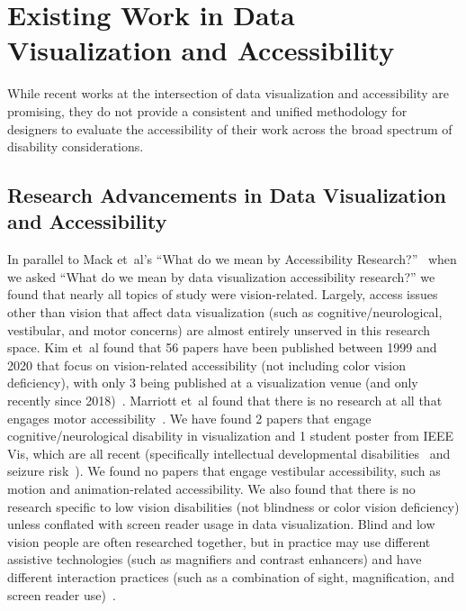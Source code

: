 \documentclass[12pt]{cmuthesis}
\newcommand{\ea}{{et~al\xperiod}\xspace}
\begin{document}
\section{Existing Work in Data Visualization and Accessibility}

While recent works at the intersection of data visualization and accessibility are promising, they do not provide a consistent and unified methodology for designers to evaluate the accessibility of their work across the broad spectrum of disability considerations.

\subsection{Research Advancements in Data Visualization and Accessibility}
In parallel to Mack \ea's ``What do we mean by Accessibility Research?''~\cite{Mack2021What} when we asked ``What do we mean by data visualization accessibility research?'' we found that nearly all topics of study were vision-related. Largely, access issues other than vision that affect data visualization (such as cognitive/neurological, vestibular, and motor concerns) are almost entirely unserved in this research space. Kim \ea found that 56 papers have been published between 1999 and 2020 that focus on vision-related accessibility (not including color vision deficiency), with only 3 being published at a visualization venue (and only recently since 2018)~\cite{Kim2021Accessible}. Marriott \ea found that there is no research at all that engages motor accessibility~\cite{Marriott}. We have found 2 papers that engage cognitive/neurological disability in visualization and 1 student poster from IEEE Vis, which are all recent (specifically intellectual developmental disabilities~\cite{Wu2021Understanding} and seizure risk~\cite{South2020Generating,South2021Detecting}). We found no papers that engage vestibular accessibility, such as motion and animation-related accessibility. We also found that there is no research specific to low vision disabilities (not blindness or color vision deficiency) unless conflated with screen reader usage in data visualization. Blind and low vision people are often researched together, but in practice may use different assistive technologies (such as magnifiers and contrast enhancers) and have different interaction practices (such as a combination of sight, magnification, and screen reader use)~\cite{szpiro_2016}. 
\end{document}

